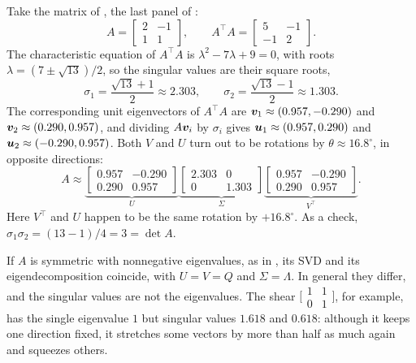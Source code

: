 \begin{example}
  \label{ex:ch04-svd}
  Take the matrix of , the last panel of
  :
  \[
    A = \begin{bmatrix} 2 & -1 \\ 1 & 1 \end{bmatrix}, \qquad
    A^\top A = \begin{bmatrix} 5 & -1 \\ -1 & 2 \end{bmatrix}.
  \]
  The characteristic equation of $A^\top A$ is $\lambda^2 - 7\lambda + 9 =
  0$, with roots $\lambda = (7 \pm \sqrt{13})/2$, so the singular values
  are their square roots,
  \[
    \sigma_1 = \frac{\sqrt{13} + 1}{2} \approx 2.303, \qquad
    \sigma_2 = \frac{\sqrt{13} - 1}{2} \approx 1.303 .
  \]
  The corresponding unit eigenvectors of $A^\top A$ are
  $\bm{v}_1 \approx (0.957, -0.290)$ and $\bm{v}_2 \approx (0.290,
  0.957)$, and dividing $A\bm{v}_i$ by $\sigma_i$ gives
  $\bm{u}_1 \approx (0.957, 0.290)$ and $\bm{u}_2 \approx (-0.290,
  0.957)$. Both $V$ and $U$ turn out to be rotations by
  $\theta \approx 16.8^\circ$, in opposite directions:
  \[
    A \approx
    \underbrace{\begin{bmatrix} 0.957 & -0.290 \\ 0.290 & 0.957
      \end{bmatrix}}_{U}
    \underbrace{\begin{bmatrix} 2.303 & 0 \\ 0 & 1.303
      \end{bmatrix}}_{\Sigma}
    \underbrace{\begin{bmatrix} 0.957 & -0.290 \\ 0.290 & 0.957
      \end{bmatrix}}_{V^\top} .
  \]
  Here $V^\top$ and $U$ happen to be the same rotation by $+16.8^\circ$.
  As a check, $\sigma_1 \sigma_2 = (13 - 1)/4 = 3 = \det A$.
\end{example}

If $A$ is symmetric with nonnegative eigenvalues, as in
, its SVD and its eigendecomposition
coincide, with $U = V = Q$ and $\Sigma = \Lambda$. In general they differ,
and the singular values are not the eigenvalues. The shear
$\bigl[\begin{smallmatrix} 1 & 1 \\ 0 & 1 \end{smallmatrix}\bigr]$, for
example, has the single eigenvalue $1$ but singular values $1.618$ and
$0.618$: although it keeps one direction fixed, it stretches some vectors
by more than half as much again and squeezes others.

